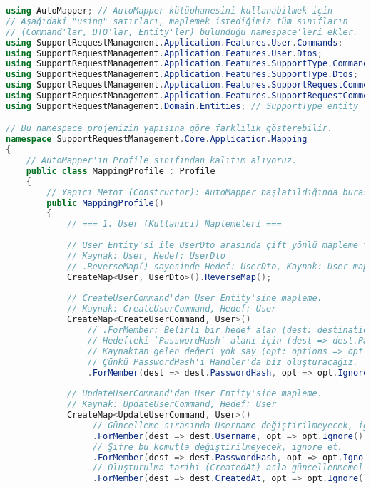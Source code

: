 \documentclass[11pt, a4paper]{article}
\begin{document}
\begin{lstlisting}[language=C#]
using AutoMapper; // AutoMapper kütüphanesini kullanabilmek için
// Aşağıdaki "using" satırları, maplemek istediğimiz tüm sınıfların
// (Command'lar, DTO'lar, Entity'ler) bulunduğu namespace'leri ekler.
using SupportRequestManagement.Application.Features.User.Commands;
using SupportRequestManagement.Application.Features.User.Dtos;
using SupportRequestManagement.Application.Features.SupportType.Commands;
using SupportRequestManagement.Application.Features.SupportType.Dtos;
using SupportRequestManagement.Application.Features.SupportRequestComment.Commands;
using SupportRequestManagement.Application.Features.SupportRequestComment.Dtos;
using SupportRequestManagement.Domain.Entities; // SupportType entity

// Bu namespace projenizin yapısına göre farklılık gösterebilir.
namespace SupportRequestManagement.Core.Application.Mapping 
{
    // AutoMapper'ın Profile sınıfından kalıtım alıyoruz.
    public class MappingProfile : Profile
    {
        // Yapıcı Metot (Constructor): AutoMapper başlatıldığında burası çalışır.
        public MappingProfile()
        {
            // === 1. User (Kullanıcı) Maplemeleri ===
            
            // User Entity'si ile UserDto arasında çift yönlü mapleme tanımlıyoruz.
            // Kaynak: User, Hedef: UserDto
            // .ReverseMap() sayesinde Hedef: UserDto, Kaynak: User map'lemesi de otomatik oluşur.
            CreateMap<User, UserDto>().ReverseMap(); 
            
            // CreateUserCommand'dan User Entity'sine mapleme.
            // Kaynak: CreateUserCommand, Hedef: User
            CreateMap<CreateUserCommand, User>()
                // .ForMember: Belirli bir hedef alan (dest: destination) için özel kural tanımlar.
                // Hedefteki `PasswordHash` alanı için (dest => dest.PasswordHash),
                // Kaynaktan gelen değeri yok say (opt: options => opt.Ignore()).
                // Çünkü PasswordHash'i Handler'da biz oluşturacağız.
                .ForMember(dest => dest.PasswordHash, opt => opt.Ignore()); 
            
            // UpdateUserCommand'dan User Entity'sine mapleme.
            // Kaynak: UpdateUserCommand, Hedef: User
            CreateMap<UpdateUserCommand, User>()
                 // Güncelleme sırasında Username değiştirilmeyecek, ignore et.
                 .ForMember(dest => dest.Username, opt => opt.Ignore()) 
                 // Şifre bu komutla değiştirilmeyecek, ignore et.
                 .ForMember(dest => dest.PasswordHash, opt => opt.Ignore()) 
                 // Oluşturulma tarihi (CreatedAt) asla güncellenmemeli, ignore et.
                 .ForMember(dest => dest.CreatedAt, opt => opt.Ignore()); 


\end{lstlisting}
\end{document}
